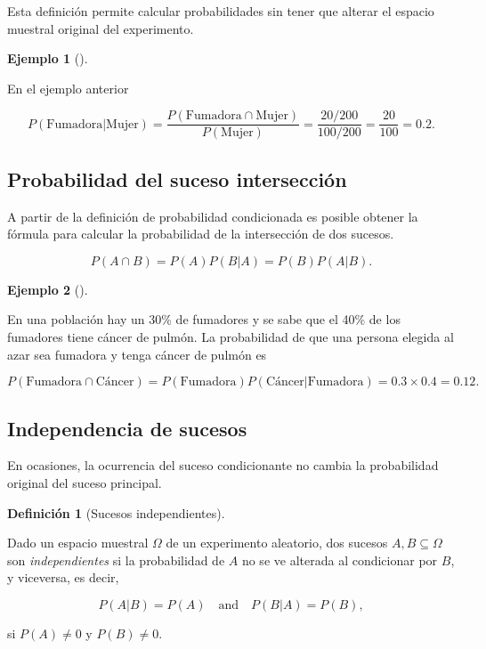\documentclass[
  a4paper,
]{scrreport}
\theoremstyle{plain}
\theoremstyle{definition}
\newtheorem{definition}{Definición}[chapter]
\theoremstyle{definition}
\newtheorem{example}{Ejemplo}[chapter]
\theoremstyle{remark}
\begin{document}
Esta definición permite calcular probabilidades sin tener que alterar el
espacio muestral original del experimento.

\begin{example}[]\protect\hypertarget{exm-probabilidad-condicionada}{}\label{exm-probabilidad-condicionada}

En el ejemplo anterior

\[P(\mbox{Fumadora}|\mbox{Mujer})= \frac{P(\mbox{Fumadora}\cap \mbox{Mujer})}{P(\mbox{Mujer})} =  \frac{20/200}{100/200}=\frac{20}{100}=0.2.\]

\end{example}

\subsection{Probabilidad del suceso
intersección}\label{probabilidad-del-suceso-intersecciuxf3n}

A partir de la definición de probabilidad condicionada es posible
obtener la fórmula para calcular la probabilidad de la intersección de
dos sucesos.

\[P(A\cap B) = P(A)P(B|A) = P(B)P(A|B).\]

\begin{example}[]\protect\hypertarget{exm-probabilidad-interseccion}{}\label{exm-probabilidad-interseccion}

En una población hay un 30\% de fumadores y se sabe que el 40\% de los
fumadores tiene cáncer de pulmón. La probabilidad de que una persona
elegida al azar sea fumadora y tenga cáncer de pulmón es

\[P(\mbox{Fumadora}\cap \mbox{Cáncer})= P(\mbox{Fumadora})P(\mbox{Cáncer}|\mbox{Fumadora}) = 0.3\times 0.4 = 0.12.\]

\end{example}

\subsection{Independencia de sucesos}\label{independencia-de-sucesos}

En ocasiones, la ocurrencia del suceso condicionante no cambia la
probabilidad original del suceso principal.

\begin{definition}[Sucesos
independientes]\protect\hypertarget{def-sucesos-independientes}{}\label{def-sucesos-independientes}

Dado un espacio muestral \(\Omega\) de un experimento aleatorio, dos
sucesos \(A,B\subseteq \Omega\) son \emph{independientes} si la
probabilidad de \(A\) no se ve alterada al condicionar por \(B\), y
viceversa, es decir,

\[P(A|B) = P(A) \quad \mbox{and} \quad P(B|A)=P(B),\]

si \(P(A)\neq 0\) y \(P(B)\neq 0\).

\end{definition}
\end{document}
